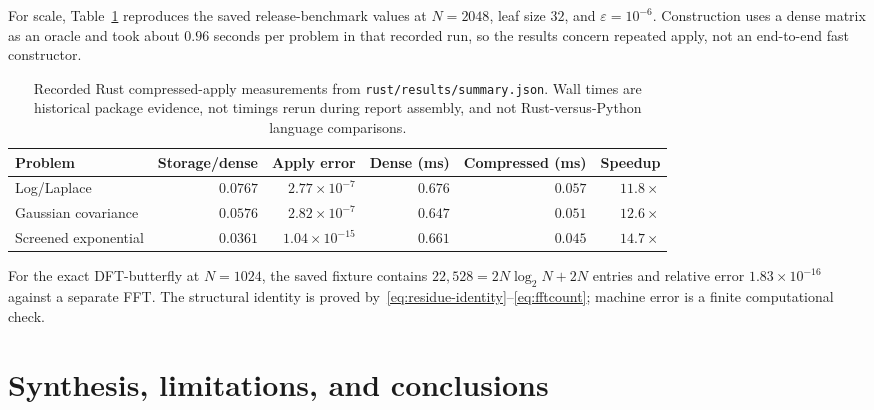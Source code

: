 \documentclass[11pt,a4paper]{article}
\newcommand{\eps}{\varepsilon}
\begin{document}
For scale, Table~\ref{tab:rustbench} reproduces the saved release-benchmark values at $N=2048$, leaf size $32$, and $\eps=10^{-6}$. Construction uses a dense matrix as an oracle and took about $0.96$ seconds per problem in that recorded run, so the results concern repeated apply, not an end-to-end fast constructor.
\begin{table}[htbp]
\centering\small
\caption{Recorded Rust compressed-apply measurements from \texttt{rust/results/summary.json}. Wall times are historical package evidence, not timings rerun during report assembly, and not Rust-versus-Python language comparisons.}
\label{tab:rustbench}
\begin{tabular}{@{}lrrrrr@{}}
\toprule
Problem & Storage/dense & Apply error & Dense (ms) & Compressed (ms) & Speedup\\
\midrule
Log/Laplace & $0.0767$ & $2.77\times10^{-7}$ & $0.676$ & $0.057$ & $11.8\times$\\
Gaussian covariance & $0.0576$ & $2.82\times10^{-7}$ & $0.647$ & $0.051$ & $12.6\times$\\
Screened exponential & $0.0361$ & $1.04\times10^{-15}$ & $0.661$ & $0.045$ & $14.7\times$\\
\bottomrule
\end{tabular}
\end{table}

For the exact DFT-butterfly at $N=1024$, the saved fixture contains $22{,}528=2N\log_2N+2N$ entries and relative error $1.83\times10^{-16}$ against a separate FFT. The structural identity is proved by~\eqref{eq:residue-identity}--\eqref{eq:fftcount}; machine error is a finite computational check.

\section{Synthesis, limitations, and conclusions}
\label{sec:conclusions}
\end{document}
